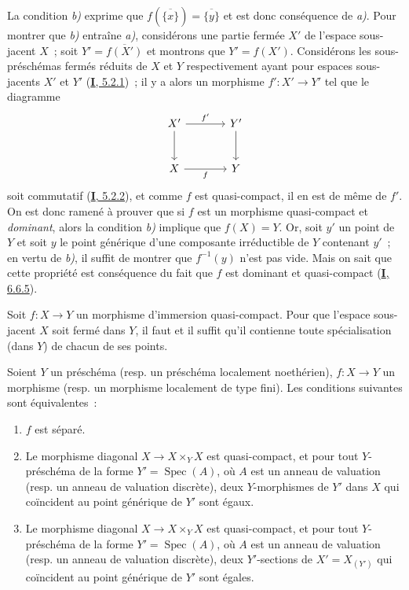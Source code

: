 La condition \emph{b)} exprime que $f(\overline{\{x\}})=\overline{\{y\}}$ et est donc
conséquence de \emph{a)}. Pour montrer que \emph{b)} entraîne \emph{a)}, considérons une partie
fermée $X'$ de l'espace sous-jacent $X$~; soit $Y'=\overline{f(X')}$ et
montrons que $Y'=f(X')$. Considérons les sous-préschémas fermés réduits de
$X$ et $Y$ respectivement ayant pour espaces sous-jacents $X'$ et $Y'$
(\hyperref[I.5.2.1-fr]{\textbf{I}, 5.2.1})~; il y a alors un morphisme $f':X'\to Y'$ tel
que le diagramme
\[
\begin{tikzcd}[column sep=large,row sep=large]
X' \arrow[r,"f'"] \arrow[d] & Y' \arrow[d] \\
X \arrow[r,"f"'] & Y
\end{tikzcd}
\]
soit commutatif (\hyperref[I.5.2.2-fr]{\textbf{I}, 5.2.2}), et comme $f$ est
quasi-compact, il en est de même de $f'$. On est donc ramené à prouver que si
$f$ est un morphisme quasi-compact et \emph{dominant}, alors la
condition \emph{b)} implique que $f(X)=Y$. Or, soit $y'$ un point de $Y$ et soit $y$
le point générique d'une composante irréductible de $Y$ contenant $y'$~; en
vertu de \emph{b)}, il suffit de montrer que $f^{-1}(y)$ n'est pas vide. Mais on sait
que cette propriété est conséquence du fait que $f$ est dominant et
quasi-compact (\hyperref[I.6.6.5-fr]{\textbf{I}, 6.6.5}).

\begin{corollary}[7.2.2]
\label{II.7.2.2-fr}
Soit $f:X\to Y$ un morphisme d'immersion quasi-compact. Pour que l'espace
sous-jacent $X$ soit fermé dans $Y$, il faut et il suffit qu'il contienne toute
spécialisation (dans $Y$) de chacun de ses points.
\end{corollary}

\begin{proposition}[7.2.3]
\label{II.7.2.3-fr}
Soient $Y$ un préschéma \textup{(resp.} un préschéma localement noethérien\textup{)}, $f:X\to Y$
un morphisme \textup{(resp.} un morphisme localement de type fini\textup{)}. Les conditions
suivantes sont équivalentes~:
\begin{enumerate}
\item[\rm a)] $f$ est séparé.
\item[\rm b)] Le morphisme diagonal $X\to X\times_YX$ est quasi-compact, et
pour tout $Y$-préschéma de la forme $Y'=\operatorname{Spec}(A)$, où $A$ est un
anneau de valuation \textup{(resp.} un anneau de valuation discrète\textup{)}, deux
$Y$-morphismes de $Y'$ dans $X$ qui coïncident au point générique de $Y'$ sont
égaux.
\item[\rm c)] Le morphisme diagonal $X\to X\times_YX$ est quasi-compact, et
pour tout $Y$-préschéma de la forme $Y'=\operatorname{Spec}(A)$, où $A$ est un
anneau de valuation \textup{(resp.} un anneau de valuation discrète\textup{)}, deux
$Y'$-sections de $X'=X_{(Y')}$ qui coïncident au point générique de $Y'$ sont
égales.
\end{enumerate}
\end{proposition}

